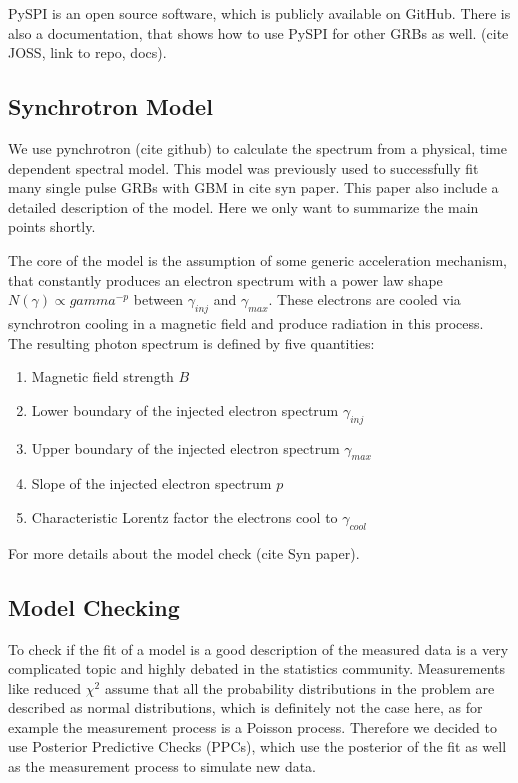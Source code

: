 \documentclass[twocolumn]{article}%
\begin{document}
PySPI is an open source software, which is publicly available on GitHub. There is also a documentation, that shows how to use PySPI for other GRBs as well. (cite JOSS, link to repo, docs).

\subsection{Synchrotron Model}

We use pynchrotron (cite github) to calculate the spectrum from a physical, time dependent spectral model. This model was previously used to successfully fit many single pulse GRBs with GBM in cite syn paper. This paper also include a detailed description of the model. Here we only want to summarize the main points shortly.

The core of the model is the assumption of some generic acceleration mechanism, that constantly produces an electron spectrum with a power law shape $N(\gamma )\propto gamma^{-p}$ between $\gamma_{inj}$ and $\gamma_{max}$. These electrons are cooled via synchrotron cooling in a magnetic field and produce radiation in this process. The resulting photon spectrum is defined by five quantities:

\begin{enumerate}
	\item Magnetic field strength $B$
  \item Lower boundary of the injected electron spectrum $\gamma_{inj}$
  \item Upper boundary of the injected electron spectrum $\gamma_{max}$
  \item Slope of the injected electron spectrum $p$
  \item Characteristic Lorentz factor the electrons cool to $\gamma_{cool}$
\end{enumerate}

For more details about the model check (cite Syn paper).

\subsection{Model Checking}

To check if the fit of a model is a good description of the measured data is a very complicated topic and highly debated in the statistics community. Measurements like reduced $\chi^{2}$ assume that all the probability distributions in the problem are described as normal distributions, which is definitely not the case here, as for example the measurement process is a Poisson process. Therefore we decided to use Posterior Predictive Checks (PPCs), which use the posterior of the fit as well as the measurement process to simulate new data.
\end{document}
